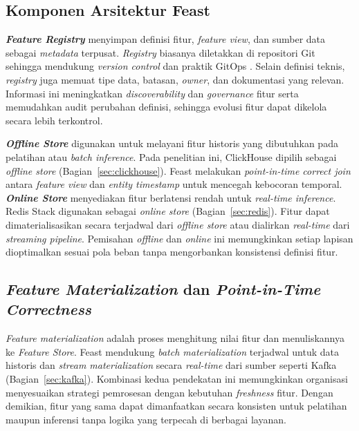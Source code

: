 \subsection{Komponen Arsitektur Feast}

\textbf{\textit{Feature Registry}} menyimpan definisi fitur, \textit{feature view}, dan sumber data sebagai \textit{metadata} terpusat. \textit{Registry} biasanya diletakkan di repositori Git sehingga mendukung \textit{version control} dan praktik GitOps \autocite{limoncelli2022gitops}. Selain definisi teknis, \textit{registry} juga memuat tipe data, batasan, \textit{owner}, dan dokumentasi yang relevan. Informasi ini meningkatkan \textit{discoverability} dan \textit{governance} fitur serta memudahkan audit perubahan definisi, sehingga evolusi fitur dapat dikelola secara lebih terkontrol.

\textbf{\textit{Offline Store}} digunakan untuk melayani fitur historis yang dibutuhkan pada pelatihan atau \textit{batch inference}. Pada penelitian ini, ClickHouse dipilih sebagai \textit{offline store} (Bagian~\ref{sec:clickhouse}). Feast melakukan \textit{point-in-time correct join} antara \textit{feature view} dan \textit{entity timestamp} untuk mencegah kebocoran temporal. \textbf{\textit{Online Store}} menyediakan fitur berlatensi rendah untuk \textit{real-time inference}. Redis Stack digunakan sebagai \textit{online store} (Bagian~\ref{sec:redis}). Fitur dapat dimaterialisasikan secara terjadwal dari \textit{offline store} atau dialirkan \textit{real-time} dari \textit{streaming pipeline}. Pemisahan \textit{offline} dan \textit{online} ini memungkinkan setiap lapisan dioptimalkan sesuai pola beban tanpa mengorbankan konsistensi definisi fitur.

\subsection{\textit{Feature Materialization} dan \textit{Point-in-Time Correctness}}

\textit{Feature materialization} adalah proses menghitung nilai fitur dan menuliskannya ke \textit{Feature Store}. Feast mendukung \textit{batch materialization} terjadwal untuk data historis dan \textit{stream materialization} secara \textit{real-time} dari sumber seperti Kafka (Bagian~\ref{sec:kafka}). Kombinasi kedua pendekatan ini memungkinkan organisasi menyesuaikan strategi pemrosesan dengan kebutuhan \textit{freshness} fitur. Dengan demikian, fitur yang sama dapat dimanfaatkan secara konsisten untuk pelatihan maupun inferensi tanpa logika yang terpecah di berbagai layanan.

